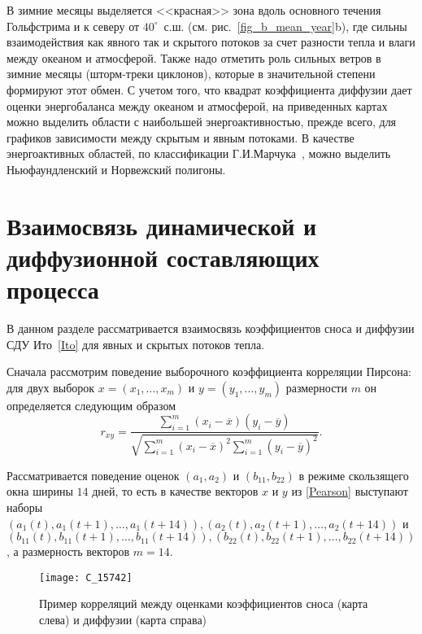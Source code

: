 В зимние месяцы выделяется <<красная>> зона вдоль основного течения Гольфстрима и к северу от $40^\circ$~с.ш. (см. рис.~\ref{fig_b_mean_year}b), %
где сильны взаимодействия как явного так и скрытого потоков за счет разности тепла и влаги между океаном и атмосферой. Также надо отметить роль сильных ветров в зимние месяцы (шторм-треки циклонов), которые в значительной степени формируют этот обмен. С учетом того, что квадрат коэффициента диффузии дает оценки энергобаланса между океаном и атмосферой, на приведенных картах можно выделить области с наибольшей энергоактивностью, прежде всего, для графиков зависимости между скрытым и явным потоками. В качестве энергоактивных областей, по классификации Г.И.Марчука~\cite{marchuk1989}, можно выделить Ньюфаундленский и Норвежский полигоны. 

\section{Взаимосвязь динамической и диффузионной составляющих процесса}
В данном разделе рассматривается взаимосвязь коэффициентов сноса и диффузии СДУ Ито~\eqref{Ito} для явных и скрытых потоков тепла. 

Сначала рассмотрим поведение выборочного коэффициента корреляции Пирсона: для двух выборок $x = (x_1, \dots, x_m)$ и $y = (y_1, \dots, y_m)$ размерности $m$ он определяется следующим образом
\begin{equation}
	\label{Pearson}
	r_{xy} = \frac{\sum_{i=1}^{m}(x_i - \overline{x})(y_i - \overline{y}) }{\sqrt{\sum_{i=1}^{m}(x_i - \overline{x})^2 \sum_{i=1}^{m}(y_i - \overline{y})^2}}.
\end{equation}

Рассматривается поведение оценок $(a_1, a_2)$ и $(b_{11}, b_{22})$
в режиме скользящего окна ширины $14$ дней, то есть в качестве векторов $x$ и $y$ из \eqref{Pearson} выступают наборы $(a_1(t), a_1(t+1), \dots, a_1(t+14)), (a_2(t), a_2(t+1), \dots, a_2(t+14))$ и $(b_{11}(t), b_{11}(t+1), \dots, b_{11}(t+14)), (b_{22}(t), b_{22}(t+1), \dots, b_{22}(t+14))$, а размерность векторов $m=14$.

\begin{figure}[!h]
	\centering
	\texttt{[image: C\_15742]}
	\caption{Пример корреляций между оценками коэффициентов сноса (карта слева) и диффузии (карта справа)}
	\label{fig_c_example}
\end{figure}

